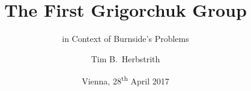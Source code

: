 \documentclass[compress]{beamer}
\author{Tim B.\ Herbstrith}
\title{The First Grigorchuk Group}
\subtitle{in Context of Burnside's Problems}
\date{Vienna, 28\textsuperscript{th} April 2017}
\DeclareMathOperator{\Z}{\mathbb{Z}}
\theoremstyle{definition}
\newtheorem{defin}[theo]{Definition}
\newtheorem{exam}[theo]{Example}
\theoremstyle{remark}
\begin{document}
  \begin{frame}
    \maketitle
  \end{frame}
  
  
%
%
%
%
%
%
\end{document}
